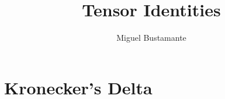 \documentclass{article}
\title{Tensor Identities}
\author{Miguel Bustamante}
\begin{document}
\maketitle
\section{Kronecker's Delta}
\end{document}
